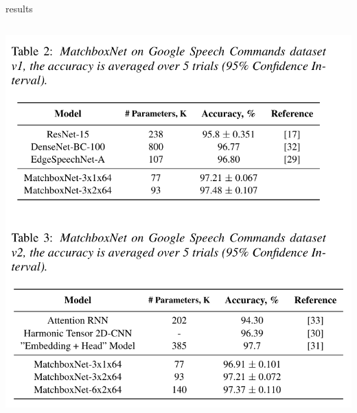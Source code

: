 \documentclass[aspectratio=169,xcolor={dvipsnames,svgnames}]{beamer}
\begin{document}
\begin{frame}[label={sec:org43e6829}]{results}
\begin{columns}
\begin{column}{0.45\columnwidth}
\begin{center}
\includegraphics[width=.9\linewidth]{org-download-images/matchboxnet/2024-11-19_11-19-19_screenshot.png}
\end{center}
\end{column}
\end{columns}
\end{frame}
\end{document}
